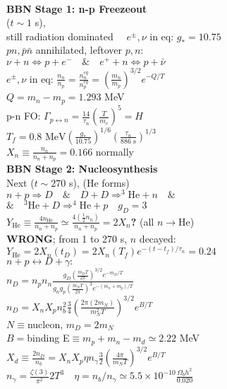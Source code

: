 \documentclass[12pt]{article}
\begin{document}
{	\\\textbf{BBN Stage 1: n-p Freezeout}
	\\($t\sim 1$ s), 
	\\still radiation dominated$\quad$ $e^\pm,\nu$ in eq: $g_*=10.75$
	\\$pn,\bar{p}\bar{n}$ annihilated, leftover $p,n$:
	\\$\nu+n\Leftrightarrow p+e^- \quad \& \quad e^++n\Leftrightarrow p +\bar{\nu}$
	\\$e^\pm,\nu$ in eq: $\frac{n_n}{n_p}=\frac{n_n^{eq}}{n_p^{eq}}=\left(\frac{m_n}{m_p}\right)^{3/2}e^{-Q/T}$
	\\$Q=m_n-m_p= 1.293$ MeV
	\\p-n FO: $\Gamma_{p\leftrightarrow n}=\frac{14}{\tau_n}\left(\frac{T}{m_e}\right)^5=H$
	\\$T_f=0.8\text{ MeV}\left(\frac{g_*}{10.75}\right)^{1/6}\left(\frac{\tau_n}{886\text{ s}}\right)^{1/3}$
	\\$X_n\equiv \frac{n_n}{n_n+n_p} = 0.166$ normally
	\\\textbf{BBN Stage 2: Nucleosynthesis}
	\\Next ($t\sim 270$ s), (He forms)
	\\$n+p \Rightarrow D \quad \& \quad D+D\Rightarrow ^3\text{He}+n \quad \&$
	\\$\& \quad ^3\text{He}+D\Rightarrow ^4\text{He} + p \quad g_D=3$
	\\$Y_\text{He}\equiv\frac{4n_\text{He}}{n_n+n_p}\simeq\frac{4\left(\frac{1}{2}n_n\right)}{n_n+n_p}=2X_n$\textbf{?} (all $n\rightarrow$He)
	\\\textbf{WRONG}; from 1 to 270 s, $n$ decayed:
	\\$Y_\text{He}=2X_n(t_D)=2X_n(T_f)e^{-(t-t_f)/\tau_n}=0.24$
	\\$n+p\leftrightarrow D +\gamma:$
	\\$n_D=n_pn_n\frac{g_D\left(\frac{m_DT}{2\pi}\right)^{3/2}e^{-m_D/T}}{g_ng_p\left(\frac{m_NT}{2\pi}\right)^3e^{-(m_n+m_p)/T}}$
	\\$n_D=X_nX_pn_b^2\frac{3}{4}\left(\frac{2\pi(2m_N)}{m_N^2T}\right)^{3/2}e^{B/T}$
	\\$N\equiv$nucleon, $m_D=2m_N$
	\\$B=$binding E$\equiv m_p+m_n-m_d\simeq 2.22$ MeV
	\\$X_d\equiv\frac{2n_D}{n_b}=X_nX_p\eta n_\gamma\frac{3}{2}\left(\frac{4\pi}{m_NT}\right)^{3/2}e^{B/T}$
	\\$n_\gamma=\frac{\zeta(3)}{\pi^2}2 T^3 \quad \eta=n_b/n_\gamma\simeq5.5\times10^{-10} \frac{\Omega_bh^2}{0.020}$
}
\end{document}
